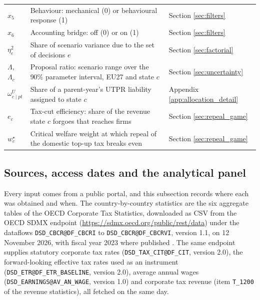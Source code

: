 \documentclass[11pt,a4paper]{article}
\begin{document}
\begin{table}[H]
\begin{tabularx}{\textwidth}{@{}lXl@{}}
$x_5$ & Behaviour: mechanical (0) or behavioural response (1) & Section \ref{sec:filters} \\
$x_6$ & Accounting bridge: off (0) or on (1) & Section \ref{sec:filters} \\
$\eta^2_e$ & Share of scenario variance due to the set of decisions $e$ & Section \ref{sec:factorial} \\
$\Lambda$, $\Lambda_c$ & Proposal ratio: scenario range over the 90\% parameter interval, EU27 and state $c$ & Section \ref{sec:uncertainty} \\
$\omega^{U}_{c\mid pt}$ & Share of a parent-year's UTPR liability assigned to state $c$ & Appendix \ref{app:allocation_detail} \\
$e_c$ & Tax-cut efficiency: share of the revenue state $c$ forgoes that reaches firms & Section \ref{sec:repeal_game} \\
$w^{\star}_c$ & Critical welfare weight at which repeal of the domestic top-up tax breaks even & Section \ref{sec:repeal_game} \\
\bottomrule
\end{tabularx}
\end{table}

\subsection{Sources, access dates and the analytical panel}\label{app:sources}

Every input comes from a public portal, and this subsection records where each was obtained and when. The country-by-country statistics are the six aggregate tables of the OECD Corporate Tax Statistics, downloaded as CSV from the OECD SDMX endpoint (\url{https://sdmx.oecd.org/public/rest/data}) under the dataflows \texttt{DSD\_CBCR@DF\_CBCRI} to \texttt{DSD\_CBCR@DF\_CBCRVI}, version 1.1, on 12 November 2026, with fiscal year 2023 where published \citep{oecd2026cbcr}. The same endpoint supplies statutory corporate tax rates (\texttt{DSD\_TAX\_CIT@DF\_CIT}, version 2.0), the forward-looking effective tax rates used as an instrument (\texttt{DSD\_ETR@DF\_ETR\_BASELINE}, version 2.0), average annual wages (\texttt{DSD\_EARNINGS@AV\_AN\_WAGE}, version 1.0) and corporate tax revenue (item \texttt{T\_1200} of the revenue statistics), all fetched on the same day.
\end{document}
